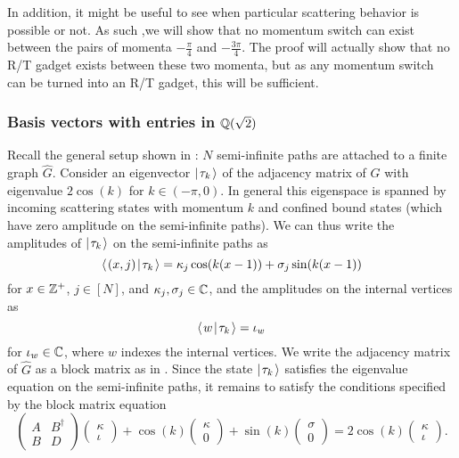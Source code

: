 \documentclass[../thesis-main/thesis-main]{subfiles}
\begin{document}
In addition, it might be useful to see when particular scattering behavior is possible or not.  As such ,we will show that no momentum switch can exist between the pairs of momenta $-\frac{\pi}{4}$ and $-\frac{3\pi}{4}$.  The proof will actually show that no R/T gadget exists between these two momenta, but as any momentum switch can be turned into an R/T gadget, this will be sufficient.


\subsubsection{Basis vectors with entries in $\mathbb{Q}(\sqrt{2})$}
\label{sec:vecs_over_field}

Recall the general setup shown in : $N$ semi-infinite paths are attached to a finite graph $\hat G$. Consider an eigenvector $|\mspace{2mu} \tau_k \mspace{2mu} \rangle$ of the adjacency matrix of $G$ with eigenvalue $2\cos(k)$ for $k\in (-\pi,0)$. In general this eigenspace is spanned by incoming scattering states with momentum $k$ and confined bound states \cite{CG12} (which have zero amplitude on the semi-infinite paths). We can thus write the amplitudes of $|\mspace{2mu} \tau_k \mspace{2mu} \rangle$ on the semi-infinite paths as
\[
  \langle\mspace{2mu} (x,j) \mspace{2mu} | \mspace{2mu} \tau_k\mspace{2mu} \rangle 
  = \kappa_j \cos(k (x-1)) + \sigma_j \sin(k (x-1))
\]
for $x \in \mathbb{Z}^+$, $j \in [N]$, and $\kappa_j,\sigma_j \in \mathbb{C}$, and the amplitudes on the internal vertices as
\[
  \langle\mspace{2mu} w \mspace{2mu} | \mspace{2mu} \tau_k\mspace{2mu} \rangle = \iota_w
\]
for $\iota_w \in \mathbb{C}$, where $w$ indexes the internal vertices. We write the adjacency matrix of $\hat{G}$ as a block matrix as in .  Since the state $|\mspace{2mu} \tau_k \mspace{2mu} \rangle$ satisfies the eigenvalue equation on the semi-infinite paths, it remains to satisfy the conditions specified by the block matrix equation
\begin{equation*}
  \begin{pmatrix} A & B^\dag\\ B & D\end{pmatrix}
	\begin{pmatrix} \kappa \\ \iota \end{pmatrix}
	+ \cos(k) \begin{pmatrix} \kappa \\ 0 \end{pmatrix}
	+ \sin(k) \begin{pmatrix} \sigma \\ 0 \end{pmatrix} 
	= 2\cos(k) \begin{pmatrix} \kappa \\ \iota \end{pmatrix}.
\end{equation*}
\end{document}
